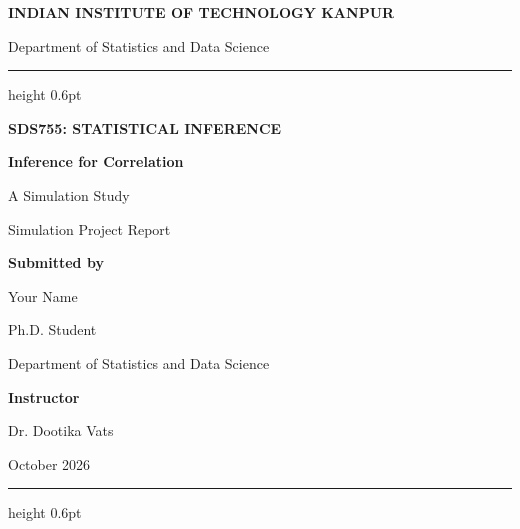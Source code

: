 
\begin{titlepage}
\thispagestyle{empty}

\begin{center}

\vspace*{1.2cm}

{\Large\bfseries INDIAN INSTITUTE OF TECHNOLOGY KANPUR\par}

\vspace{0.4cm}

{\large Department of Statistics and Data Science\par}

\vspace{1.2cm}
\hrule height 0.6pt
\vspace{1.2cm}

{\Large\bfseries SDS755: STATISTICAL INFERENCE\par}

\vspace{1.5cm}

{\huge\bfseries Inference for Correlation\par}

\vspace{0.5cm}

{\Large A Simulation Study\par}

\vspace{1cm}

{\large Simulation Project Report\par}

\vfill

{\large\bfseries Submitted by\par}
\vspace{0.3cm}

{\large Your Name\par}

Ph.D. Student

Department of Statistics and Data Science

\vspace{1cm}

{\large\bfseries Instructor\par}
\vspace{0.2cm}

Dr. Dootika Vats

\vfill

October 2026

\vspace{1cm}
\hrule height 0.6pt

\end{center}
\end{titlepage}
